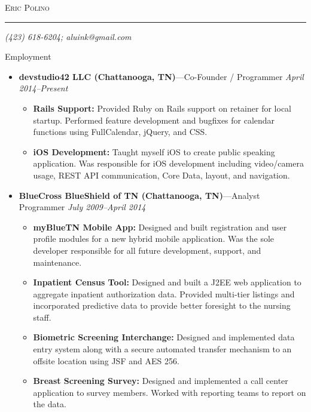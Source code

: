 \documentclass[11pt,oneside]{article}
\makeatletter
\newcommand{\name}{Eric Polino}
\newcommand{\phone}{(423) 618-6204}
\newcommand{\email}{aluink@gmail.com}
\newcommand{\bigname}[1]{
	\begin{center}\fontfamily{phv}\selectfont\Huge\scshape#1\end{center}
}
\newenvironment{ressection}[1]{
	\vspace{4pt}
	{\fontfamily{phv}\selectfont\Large#1}
	\begin{itemize}
	\vspace{3pt}
}{
	\end{itemize}
}
\newcommand{\ressubitem}[1]{
	\vspace{-1pt}
	\item \begin{flushleft} #1 \end{flushleft}
}
\newcommand{\resbigitem}[3]{
	\vspace{-5pt}
	\item
	{\textbf{#1}---#2 \hfill \textit{#3}}
}
\newenvironment{restitledposition}[3]{
	\resbigitem{#1}{#2}{#3}
	\vspace{-2pt}
	\begin{itemize}
}{
	\end{itemize}
}
\makeatother
\begin{document}
 \selectfont

\bigname{\name}

\vspace{-8pt} \rule{\textwidth}{1pt}

\vspace{-1pt} {\small\itshape \hfill \phone; \email \hfill}

\vspace{8 pt}

\begin{ressection}{Employment}

  \begin{restitledposition}{devstudio42 LLC (Chattanooga, TN)}{Co-Founder / Programmer}{April 2014--Present}
    \ressubitem{\textbf{Rails Support:} Provided Ruby on Rails support on retainer for local startup.
    Performed feature development and bugfixes for calendar functions using FullCalendar, jQuery, and CSS.}
    \ressubitem{\textbf{iOS Development:} Taught myself iOS to create public speaking application.
    Was responsible for iOS development including video/camera usage, REST API communication, 
    Core Data, layout, and navigation.}
  \end{restitledposition}

	\begin{restitledposition}{BlueCross BlueShield of TN (Chattanooga, TN)}{Analyst
Programmer}{July 2009--April 2014}

    \ressubitem{\textbf{myBlueTN Mobile App:} Designed and built registration
    and user profile modules for a new hybrid mobile application. 
    Was the sole developer responsible for all future development, support, and 
    maintenance.}

		\ressubitem{\textbf{Inpatient Census Tool:} Designed and built a J2EE web 
    application to aggregate inpatient authorization data. Provided 
    multi-tier listings and incorporated predictive data to provide	better 
    foresight to the nursing staff.}
		
		\ressubitem{\textbf{Biometric Screening Interchange:} Designed and implemented
    data entry system along with a secure automated transfer mechanism to an
    offsite location using JSF and AES 256.}

		\ressubitem{\textbf{Breast Screening Survey:} Designed and implemented a call center application
		to survey members. Worked with reporting teams to report on the data.}

	\end{restitledposition}


\end{ressection}
\end{document}
